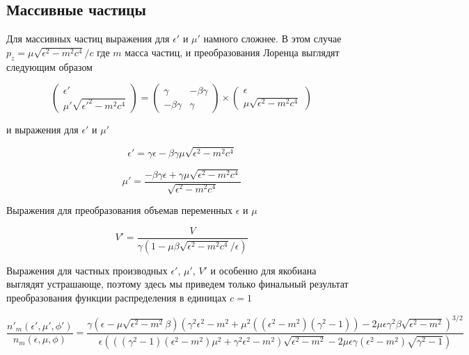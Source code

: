 \subsection{Массивные частицы}

Для массивных частиц выражения для $\epsilon'$ и $\mu'$ намного сложнее. В этом случае $p_z = \mu \sqrt{\epsilon^2 - m^2 c^4}/c$ где $m$ масса частиц, и преобразования Лоренца выглядят следующим образом

\begin{equation}\label{lorentz_m}
\left(\begin{array}{c}
\epsilon'\\
\mu'\sqrt{{\epsilon'}^2 - m^2 c^4}
\end{array}
\right)
= \left(
\begin{array}{cc}
\gamma & -\beta\gamma\\
-\beta\gamma & \gamma
\end{array}
\right)
\times
\left(\begin{array}{c}
\epsilon\\
\mu\sqrt{{\epsilon}^2-m^2 c^4}
\end{array}
\right)
\end{equation}

и выражения для $\epsilon'$ и $\mu'$

\begin{equation}
\epsilon' = \gamma\epsilon-\beta\gamma\mu\sqrt{\epsilon^2-m^2 c^4}
\end{equation}

\begin{equation}
\mu' = \frac{-\beta\gamma\epsilon+\gamma\mu\sqrt{{\epsilon}^2-m^2 c^4}}{\sqrt{{\epsilon^2 - m^2 c^4}}}
\end{equation}

Выражения для преобразования объемав переменных $\epsilon$ и $\mu$

\begin{equation}
V'=\frac{V}{\gamma(1-\mu\beta\sqrt{{\epsilon}^2-m^2 c^4}/\epsilon)}
\end{equation}

Выражения для частных производных $\epsilon'$, $\mu'$, $V'$ и особенно для якобиана выглядят устрашающе, поэтому здесь мы приведем только финальный результат преобразования функции распределения в единицах $c = 1$

\begin{equation}
\frac{n'_{m}(\epsilon',\mu',\phi')}{n_{m}(\epsilon,\mu,\phi)}= \frac{\gamma(\epsilon-\mu\sqrt{{\epsilon}^2-m^2}\beta)(\gamma^2\epsilon^2-m^2 + \mu^2 ((\epsilon^2-m^2)(\gamma^2-1)) - 2\mu\epsilon\gamma^2\beta\sqrt{\epsilon^2-m^2})^{3/2}}{\epsilon(((\gamma^2-1)(\epsilon^2-m^2)\mu^2 + \gamma^2\epsilon^2 - m^2)\sqrt{\epsilon^2-m^2}-2\mu\epsilon\gamma(\epsilon^2 - m^2)\sqrt{\gamma^2 - 1})}
\end{equation}

